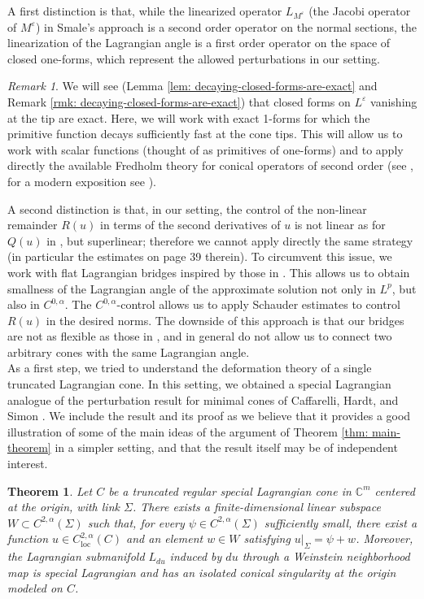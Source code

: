 \documentclass[11pt]{amsart}
\newtheorem{theorem}{Theorem}
\theoremstyle{definition}
\theoremstyle{remark}
\newtheorem{remark}{Remark}
\newcommand{\C}{\mathbb{C}}
\begin{document}
A first distinction is that, while the linearized operator $L_{M^\varepsilon}$ (the Jacobi operator of $M^\varepsilon$) in Smale's approach is a second order operator on the normal sections, the linearization of the Lagrangian angle is a first order operator on the space of closed one-forms, which represent the allowed perturbations in our setting.
\begin{remark}
    We will see (Lemma \ref{lem: decaying-closed-forms-are-exact} and Remark \ref{rmk: decaying-closed-forms-are-exact}) that 
    closed forms on $L^\varepsilon$ vanishing at the tip are exact. Here, we will work with exact 1-forms for which the primitive function decays sufficiently fast at the cone tips. This will allow us to work with scalar functions (thought of as primitives of one-forms) and to apply directly the available Fredholm theory for conical operators of second order (see \cite{Mazzeo-Edge,LockhartMcOwen, Sm93}, for a modern exposition see \cite[Section 2]{FMM}).
\end{remark} 
A second distinction is that, in our setting, the control of the non-linear remainder $R(u)$ in terms of the second derivatives of $u$ is not linear as for $Q(u)$ in \cite[Proposition 3.3]{Sm93}, but superlinear; therefore we cannot apply directly the same strategy (in particular the estimates on page 39 therein). To circumvent this issue, we work with flat Lagrangian bridges inspired by those in \cite{Dim25}. This allows us to obtain smallness of the Lagrangian angle of the approximate solution not only in $L^p$, but also in $C^{0,\alpha}$. The $C^{0,\alpha}$-control allows us to apply Schauder estimates to control $R(u)$ in the desired norms. The downside of this approach is that our bridges are not as flexible as those in \cite{Sm93}, and in general do not allow us to connect two arbitrary cones with the same Lagrangian angle. \\

As a first step, we tried to understand the deformation theory of a single truncated Lagrangian cone. In this setting, we obtained a special Lagrangian analogue of the perturbation result for minimal cones of Caffarelli, Hardt, and Simon \cite{CHS}.
We include the result and its proof as we believe that it provides a good illustration of some of the main ideas of the argument of Theorem \ref{thm: main-theorem} in a simpler setting, and that the result itself may be of independent interest.
\begin{theorem}\label{thm: CHS-intro}
    Let $C$ be a truncated regular special Lagrangian cone in $\C^m$ centered at the origin, with link $\Sigma$. There exists a
finite-dimensional linear subspace
$W\subset C^{2,\alpha}(\Sigma)$
such that, for every $\psi\in C^{2,\alpha}(\Sigma)$ sufficiently small,
there exist a function
$u\in C^{2,\alpha}_{\mathrm{loc}}(C)$
and an element $w\in W$ satisfying
$u|_\Sigma=\psi+w$. Moreover, the Lagrangian submanifold $L_{du}$ induced by $du$ through a Weinstein neighborhood map is special Lagrangian and has an isolated conical singularity at the origin modeled on $C$. 
\end{theorem}
\end{document}
